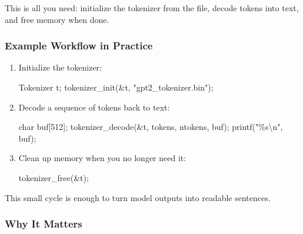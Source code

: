 \documentclass[
  letterpaper,
  DIV=11,
  numbers=noendperiod]{scrreprt}
\newenvironment{Shaded}{\begin{snugshade}}{\end{snugshade}}
\newcommand{\DataTypeTok}[1]{\textcolor[rgb]{0.68,0.00,0.00}{#1}}
\newcommand{\DecValTok}[1]{\textcolor[rgb]{0.68,0.00,0.00}{#1}}
\newcommand{\NormalTok}[1]{\textcolor[rgb]{0.00,0.23,0.31}{#1}}
\newcommand{\OperatorTok}[1]{\textcolor[rgb]{0.37,0.37,0.37}{#1}}
\newcommand{\SpecialCharTok}[1]{\textcolor[rgb]{0.37,0.37,0.37}{#1}}
\newcommand{\StringTok}[1]{\textcolor[rgb]{0.13,0.47,0.30}{#1}}
\begin{document}
This is all you need: initialize the tokenizer from the file, decode
tokens into text, and free memory when done.

\subsubsection{Example Workflow in
Practice}\label{example-workflow-in-practice}

\begin{enumerate}
\def\labelenumi{\arabic{enumi}.}
\item
  Initialize the tokenizer:

\begin{Shaded}
\begin{Highlighting}[]
\NormalTok{Tokenizer t}\OperatorTok{;}
\NormalTok{tokenizer\_init}\OperatorTok{(\&}\NormalTok{t}\OperatorTok{,} \StringTok{"gpt2\_tokenizer.bin"}\OperatorTok{);}
\end{Highlighting}
\end{Shaded}
\item
  Decode a sequence of tokens back to text:

\begin{Shaded}
\begin{Highlighting}[]
\DataTypeTok{char}\NormalTok{ buf}\OperatorTok{[}\DecValTok{512}\OperatorTok{];}
\NormalTok{tokenizer\_decode}\OperatorTok{(\&}\NormalTok{t}\OperatorTok{,}\NormalTok{ tokens}\OperatorTok{,}\NormalTok{ ntokens}\OperatorTok{,}\NormalTok{ buf}\OperatorTok{);}
\NormalTok{printf}\OperatorTok{(}\StringTok{"}\SpecialCharTok{\%s\textbackslash{}n}\StringTok{"}\OperatorTok{,}\NormalTok{ buf}\OperatorTok{);}
\end{Highlighting}
\end{Shaded}
\item
  Clean up memory when you no longer need it:

\begin{Shaded}
\begin{Highlighting}[]
\NormalTok{tokenizer\_free}\OperatorTok{(\&}\NormalTok{t}\OperatorTok{);}
\end{Highlighting}
\end{Shaded}
\end{enumerate}

This small cycle is enough to turn model outputs into readable
sentences.

\subsubsection{Why It Matters}\label{why-it-matters}
\end{document}
